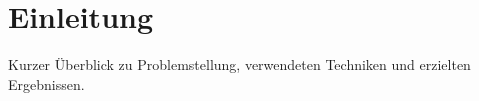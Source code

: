 \chapter{Einleitung}
\renewcommand{\thepage}{\arabic{page}}
\setcounter{page}{1}
Kurzer \"Uberblick zu Problemstellung, verwendeten Techniken 
und erzielten Ergebnissen.